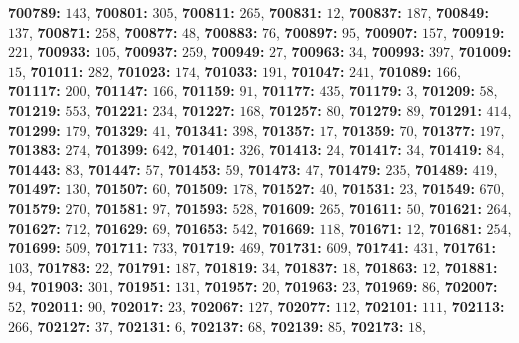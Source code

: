 \textsf{\bfseries 700789:} $143$, \textsf{\bfseries 700801:} $305$, \textsf{\bfseries 700811:} $265$, \textsf{\bfseries 700831:} $12$, \textsf{\bfseries 700837:} $187$, \textsf{\bfseries 700849:} $137$, \textsf{\bfseries 700871:} $258$, \textsf{\bfseries 700877:} $48$, \textsf{\bfseries 700883:} $76$, \textsf{\bfseries 700897:} $95$, \textsf{\bfseries 700907:} $157$, \textsf{\bfseries 700919:} $221$, \textsf{\bfseries 700933:} $105$, \textsf{\bfseries 700937:} $259$, \textsf{\bfseries 700949:} $27$, \textsf{\bfseries 700963:} $34$, \textsf{\bfseries 700993:} $397$, \textsf{\bfseries 701009:} $15$, \textsf{\bfseries 701011:} $282$, \textsf{\bfseries 701023:} $174$, \textsf{\bfseries 701033:} $191$, \textsf{\bfseries 701047:} $241$, \textsf{\bfseries 701089:} $166$, \textsf{\bfseries 701117:} $200$, \textsf{\bfseries 701147:} $166$, \textsf{\bfseries 701159:} $91$, \textsf{\bfseries 701177:} $435$, \textsf{\bfseries 701179:} $3$, \textsf{\bfseries 701209:} $58$, \textsf{\bfseries 701219:} $553$, \textsf{\bfseries 701221:} $234$, \textsf{\bfseries 701227:} $168$, \textsf{\bfseries 701257:} $80$, \textsf{\bfseries 701279:} $89$, \textsf{\bfseries 701291:} $414$, \textsf{\bfseries 701299:} $179$, \textsf{\bfseries 701329:} $41$, \textsf{\bfseries 701341:} $398$, \textsf{\bfseries 701357:} $17$, \textsf{\bfseries 701359:} $70$, \textsf{\bfseries 701377:} $197$, \textsf{\bfseries 701383:} $274$, \textsf{\bfseries 701399:} $642$, \textsf{\bfseries 701401:} $326$, \textsf{\bfseries 701413:} $24$, \textsf{\bfseries 701417:} $34$, \textsf{\bfseries 701419:} $84$, \textsf{\bfseries 701443:} $83$, \textsf{\bfseries 701447:} $57$, \textsf{\bfseries 701453:} $59$, \textsf{\bfseries 701473:} $47$, \textsf{\bfseries 701479:} $235$, \textsf{\bfseries 701489:} $419$, \textsf{\bfseries 701497:} $130$, \textsf{\bfseries 701507:} $60$, \textsf{\bfseries 701509:} $178$, \textsf{\bfseries 701527:} $40$, \textsf{\bfseries 701531:} $23$, \textsf{\bfseries 701549:} $670$, \textsf{\bfseries 701579:} $270$, \textsf{\bfseries 701581:} $97$, \textsf{\bfseries 701593:} $528$, \textsf{\bfseries 701609:} $265$, \textsf{\bfseries 701611:} $50$, \textsf{\bfseries 701621:} $264$, \textsf{\bfseries 701627:} $712$, \textsf{\bfseries 701629:} $69$, \textsf{\bfseries 701653:} $542$, \textsf{\bfseries 701669:} $118$, \textsf{\bfseries 701671:} $12$, \textsf{\bfseries 701681:} $254$, \textsf{\bfseries 701699:} $509$, \textsf{\bfseries 701711:} $733$, \textsf{\bfseries 701719:} $469$, \textsf{\bfseries 701731:} $609$, \textsf{\bfseries 701741:} $431$, \textsf{\bfseries 701761:} $103$, \textsf{\bfseries 701783:} $22$, \textsf{\bfseries 701791:} $187$, \textsf{\bfseries 701819:} $34$, \textsf{\bfseries 701837:} $18$, \textsf{\bfseries 701863:} $12$, \textsf{\bfseries 701881:} $94$, \textsf{\bfseries 701903:} $301$, \textsf{\bfseries 701951:} $131$, \textsf{\bfseries 701957:} $20$, \textsf{\bfseries 701963:} $23$, \textsf{\bfseries 701969:} $86$, \textsf{\bfseries 702007:} $52$, \textsf{\bfseries 702011:} $90$, \textsf{\bfseries 702017:} $23$, \textsf{\bfseries 702067:} $127$, \textsf{\bfseries 702077:} $112$, \textsf{\bfseries 702101:} $111$, \textsf{\bfseries 702113:} $266$, \textsf{\bfseries 702127:} $37$, \textsf{\bfseries 702131:} $6$, \textsf{\bfseries 702137:} $68$, \textsf{\bfseries 702139:} $85$, \textsf{\bfseries 702173:} $18$, 

